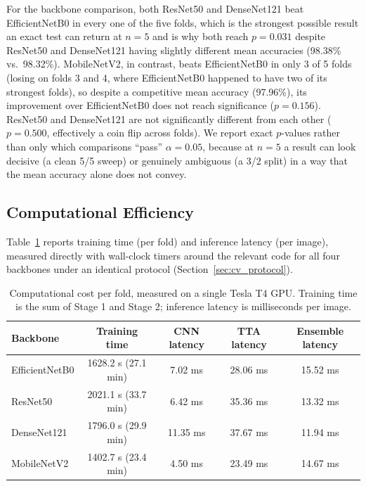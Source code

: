 \documentclass[11pt]{article}
\begin{document}
For the backbone comparison, both ResNet50 and DenseNet121 beat EfficientNetB0 in every one of the five folds, which is the strongest possible result an exact test can return at $n=5$ and is why both reach $p=0.031$ despite ResNet50 and DenseNet121 having slightly different mean accuracies (98.38\% vs.\ 98.32\%). MobileNetV2, in contrast, beats EfficientNetB0 in only 3 of 5 folds (losing on folds 3 and 4, where EfficientNetB0 happened to have two of its strongest folds), so despite a competitive mean accuracy (97.96\%), its improvement over EfficientNetB0 does not reach significance ($p=0.156$). ResNet50 and DenseNet121 are not significantly different from each other ($p=0.500$, effectively a coin flip across folds). We report exact $p$-values rather than only which comparisons ``pass'' $\alpha=0.05$, because at $n=5$ a result can look decisive (a clean 5/5 sweep) or genuinely ambiguous (a 3/2 split) in a way that the mean accuracy alone does not convey.

\subsection{Computational Efficiency}
\label{sec:efficiency}

Table~\ref{tab:efficiency} reports training time (per fold) and inference latency (per image), measured directly with wall-clock timers around the relevant code for all four backbones under an identical protocol (Section~\ref{sec:cv_protocol}).

\begin{table}[htbp]
\centering
\caption{Computational cost per fold, measured on a single Tesla T4 GPU. Training time is the sum of Stage 1 and Stage 2; inference latency is milliseconds per image.}
\label{tab:efficiency}
\small
\begin{tabular}{@{}lcccc@{}}
\toprule
\textbf{Backbone} & \textbf{Training time} & \textbf{CNN latency} & \textbf{TTA latency} & \textbf{Ensemble latency} \\
\midrule
EfficientNetB0 & 1628.2 s (27.1 min) & 7.02 ms & 28.06 ms & 15.52 ms \\
ResNet50     & 2021.1 s (33.7 min) & 6.42 ms & 35.36 ms & 13.32 ms \\
DenseNet121  & 1796.0 s (29.9 min) & 11.35 ms & 37.67 ms & 11.94 ms \\
MobileNetV2  & 1402.7 s (23.4 min) & 4.50 ms & 23.49 ms & 14.67 ms \\
\bottomrule
\end{tabular}
\end{table}
\end{document}
